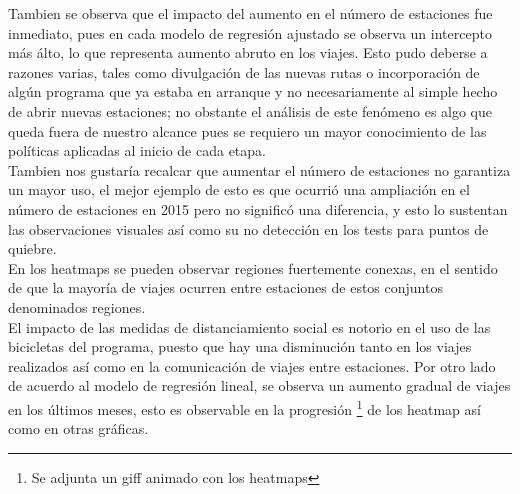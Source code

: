 \documentclass[
]{article}
\begin{document}
  Tambien se observa que el impacto del aumento en el número de estaciones fue inmediato, pues en cada modelo de regresión ajustado se observa un intercepto más álto, lo que representa aumento abruto en los viajes. Esto pudo deberse a razones varias, tales como divulgación de las nuevas rutas o incorporación de algún programa que ya estaba en arranque y no necesariamente al simple hecho de abrir nuevas estaciones; no obstante el análisis de este fenómeno es algo que queda fuera de nuestro alcance pues se requiero un mayor conocimiento de las políticas aplicadas al inicio de cada etapa.\\

  Tambien nos gustaría recalcar que aumentar el número de estaciones no
  garantiza un mayor uso, el mejor ejemplo de esto es que ocurrió una ampliación en el número de estaciones en 2015 pero no
  significó una diferencia, y esto lo sustentan las observaciones
  visuales así como su no detección en los tests para puntos de quiebre.\\

  En los heatmaps se pueden observar regiones fuertemente conexas, en el sentido de que la mayoría de viajes ocurren entre estaciones de estos conjuntos denominados regiones.\\

  El impacto de las medidas de distanciamiento social es notorio en el
  uso de las bicicletas del programa, puesto que hay una disminución tanto en los viajes realizados así como en la comunicación de viajes entre estaciones. Por otro lado de acuerdo al modelo de regresión lineal, se observa un aumento gradual de viajes en los últimos meses, esto es observable en la progresión \footnote{Se adjunta un giff animado con los heatmaps} de los heatmap así como en otras gráficas.
\end{document}
